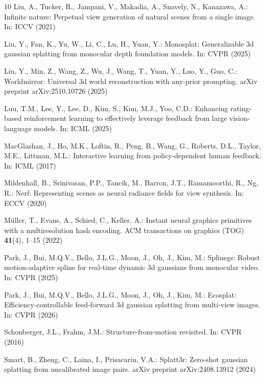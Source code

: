\documentclass[runningheads]{llncs}
\begin{document}
\begin{thebibliography}{10}
Liu, A., Tucker, R., Jampani, V., Makadia, A., Snavely, N., Kanazawa, A.: Infinite nature: Perpetual view generation of natural scenes from a single image. In: ICCV (2021)

Liu, Y., Fan, K., Yu, W., Li, C., Lu, H., Yuan, Y.: Monosplat: Generalizable 3d gaussian splatting from monocular depth foundation models. In: CVPR (2025)

Liu, Y., Min, Z., Wang, Z., Wu, J., Wang, T., Yuan, Y., Luo, Y., Guo, C.: Worldmirror: Universal 3d world reconstruction with any-prior prompting. arXiv preprint arXiv:2510.10726  (2025)

Luu, T.M., Lee, Y., Lee, D., Kim, S., Kim, M.J., Yoo, C.D.: Enhancing rating-based reinforcement learning to effectively leverage feedback from large vision-language models. In: ICML (2025)

MacGlashan, J., Ho, M.K., Loftin, R., Peng, B., Wang, G., Roberts, D.L., Taylor, M.E., Littman, M.L.: Interactive learning from policy-dependent human feedback. In: ICML (2017)

Mildenhall, B., Srinivasan, P.P., Tancik, M., Barron, J.T., Ramamoorthi, R., Ng, R.: Nerf: Representing scenes as neural radiance fields for view synthesis. In: ECCV (2020)

M{\"u}ller, T., Evans, A., Schied, C., Keller, A.: Instant neural graphics primitives with a multiresolution hash encoding. ACM transactions on graphics (TOG)  \textbf{41}(4),  1--15 (2022)

Park, J., Bui, M.Q.V., Bello, J.L.G., Moon, J., Oh, J., Kim, M.: Splinegs: Robust motion-adaptive spline for real-time dynamic 3d gaussians from monocular video. In: CVPR (2025)

Park, J., Bui, M.Q.V., Bello, J.L.G., Moon, J., Oh, J., Kim, M.: Ecosplat: Efficiency-controllable feed-forward 3d gaussian splatting from multi-view images. In: CVPR (2026)

Schonberger, J.L., Frahm, J.M.: Structure-from-motion revisited. In: CVPR (2016)

Smart, B., Zheng, C., Laina, I., Prisacariu, V.A.: Splatt3r: Zero-shot gaussian splatting from uncalibrated image pairs. arXiv preprint arXiv:2408.13912  (2024)


\end{thebibliography}
\end{document}
